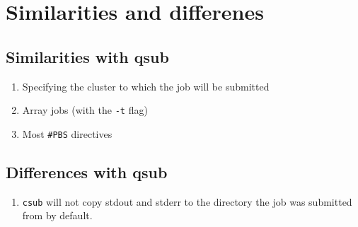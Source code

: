 \section{Similarities and differenes}

\subsection{Similarities with qsub}

\begin{enumerate}
    \item Specifying the cluster to which the job will be submitted
    \item Array jobs (with the \lstinline|-t| flag)
    \item Most \lstinline|#PBS| directives
\end{enumerate}


\subsection{Differences with qsub}

\begin{enumerate}
    \item \lstinline|csub| will not copy stdout and stderr to the directory
        the job was submitted from by default. %
\end{enumerate}
